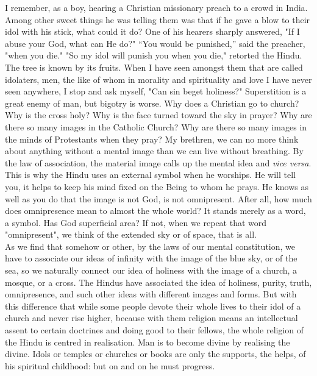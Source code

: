 I remember, as a boy, hearing a Christian missionary preach to
a crowd in India.
Among other sweet things he was telling them was that if he gave a blow
to their idol
with his stick, what could it do? One of his hearers sharply answered,
"If I
abuse your God, what can He do?" “You would be punished,” said the
preacher, "when you die." "So my idol will punish you when you
die," retorted the Hindu.\\

The tree is known by its fruits. When I have seen amongst them
that are called
idolaters, men, the like of whom in morality and spirituality and love
I have never
seen anywhere, I stop and ask myself, "Can sin beget holiness?"
Superstition is a great enemy of man, but bigotry is worse. Why does a
Christian go to church? Why is the cross holy? Why is the face turned
toward the sky in prayer? Why are there so many images in the
Catholic Church? Why are there so
many images in the minds of Protestants when they
pray? My brethren, we can no more think about anything without a mental
image than we
can live without breathing. By the law of association, the material
image calls up the
mental idea and  \textit{vice versa}. This is why the Hindu
uses an external symbol when
he worships. He will tell you, it helps to keep his mind fixed on the
Being to whom he
prays. He knows as well as you do that the image is not God, is not
omnipresent.
After all, how much does omnipresence mean to almost the whole world?
It stands merely
as a word, a symbol. Has God superficial area? If not, when we repeat
that
word "omnipresent", we think of the extended sky or of space, that is
all.\\

As we find that somehow or other, by the laws of our mental
constitution, we have to
associate our ideas of infinity with the image of the blue sky, or of
the sea, so we
naturally connect our idea of holiness with the image of a church, a
mosque, or a
cross. The Hindus have associated the idea of holiness, purity, truth,
omnipresence,
and such other ideas with different images and forms. But with this
difference that
while some people devote their whole lives to their idol of a church
and never rise
higher, because with them religion means an intellectual assent to
certain doctrines
and doing good to their fellows, the whole religion of the Hindu is
centred in
realisation. Man is to become divine by realising the divine. Idols or
temples or
churches or books are only the supports, the helps, of his spiritual
childhood: but on
and on he must progress.\\

